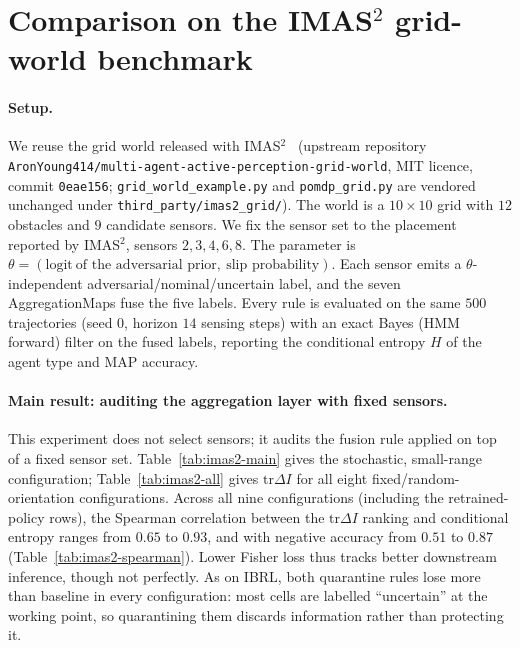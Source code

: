 \documentclass[11pt,a4paper]{article}
\begin{document}
\section{Comparison on the IMAS$^2$ grid-world benchmark}
\label{sec:imas2-grid}

\paragraph{Setup.}
We reuse the grid world released with IMAS$^2$~\citep{shi2026imas2}
(upstream repository \texttt{AronYoung414/multi-agent-active-perception-grid-world},
MIT licence, commit \texttt{0eae156}; \texttt{grid\_world\_example.py} and
\texttt{pomdp\_grid.py} are vendored unchanged under
\texttt{third\_party/imas2\_grid/}). The world is a $10\times10$ grid with $12$
obstacles and $9$ candidate sensors. We fix the sensor set to the placement
reported by IMAS$^2$, sensors $2,3,4,6,8$. The parameter is
$\theta=(\mathrm{logit}\ \text{of the adversarial prior},\ \text{slip probability})$.
Each sensor emits a $\theta$-independent adversarial/nominal/uncertain label,
and the seven AggregationMaps fuse the five labels. Every rule is evaluated on
the same $500$ trajectories (seed $0$, horizon $14$ sensing steps) with an
exact Bayes (HMM forward) filter on the fused labels, reporting the
conditional entropy $H$ of the agent type and MAP accuracy.

\paragraph{Main result: auditing the aggregation layer with fixed sensors.}
This experiment does not select sensors; it audits the fusion rule applied
on top of a fixed sensor set. Table~\ref{tab:imas2-main} gives the stochastic,
small-range configuration; Table~\ref{tab:imas2-all} gives
$\mathrm{tr}\Delta I$ for all eight fixed/random-orientation configurations.
Across all nine configurations (including the retrained-policy rows), the
Spearman correlation between the $\mathrm{tr}\Delta I$ ranking and conditional
entropy ranges from $0.65$ to $0.93$, and with negative accuracy from $0.51$
to $0.87$ (Table~\ref{tab:imas2-spearman}). Lower Fisher loss thus tracks
better downstream inference, though not perfectly. As on IBRL, both
quarantine rules lose more than baseline in every configuration: most cells
are labelled ``uncertain'' at the working point, so quarantining them discards
information rather than protecting it.
\end{document}
